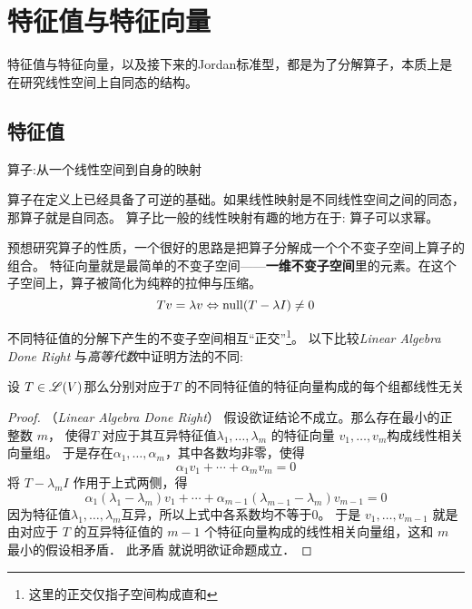 \chapter{特征值与特征向量}
特征值与特征向量，以及接下来的Jordan标准型，都是为了分解算子，本质上是在研究线性空间上自同态的结构。

\section{特征值}
\begin{definition}
    算子:从一个线性空间到自身的映射
\end{definition}

算子在定义上已经具备了可逆的基础。如果线性映射是不同线性空间之间的同态，那算子就是自同态。
算子比一般的线性映射有趣的地方在于: 算子可以求幂。

预想研究算子的性质，一个很好的思路是把算子分解成一个个不变子空间上算子的组合。
特征向量就是最简单的不变子空间——\textbf{一维不变子空间}里的元素。在这个子空间上，算子被简化为纯粹的拉伸与压缩。
\[
    Tv=\lambda v \Leftrightarrow \operatorname{null}(T-\lambda I)\neq {0}
\]

不同特征值的分解下产生的不变子空间相互``正交''\footnote{这里的正交仅指子空间构成直和}。
以下比较\textit{Linear Algebra Done Right} 与\textit{高等代数}中证明方法的不同:

\begin{theorem}
    设 \(T \in \mathscr{L}(V)\)那么分别对应于\(T\) 的不同特征值的特征向量构成的每个组都线性无关
\end{theorem}

\begin{proof}
    （\textit{Linear Algebra Done Right}）
    假设欲证结论不成立。那么存在最小的正整数 \(m\)， 使得\(T\)
    对应于其互异特征值\(\lambda_1, \dots ,\lambda_{m}\)
    的特征向量 \(v_1, \dots, v_m\)构成线性相关向量组。
    于是存在\(\alpha_1, \dots ,\alpha_{m}\)，其中各数均非零，使得
    \[\alpha_1 v_1 + \cdots + \alpha_m v_m = 0\]
    将 \(T-\lambda_{m}I\) 作用于上式两侧，得
    \[
        \alpha_1 (\lambda_1 - \lambda_m)v_1 + \cdots +
        \alpha_{m-1} (\lambda_{m-1} - \lambda_m)v_{m-1} = 0
    \]
    因为特征值\(\lambda_1,\dots ,\lambda_{m}\)互异，所以上式中各系数均不等于0。
    于是 \(v_1, \dots , v_{m-1}\) 就是由对应于 \(T\)
    的互异特征值的 \(m- 1\) 个特征向量构成的线性相关向量组，这和 \(m\) 最小的假设相矛盾． 此矛盾
    就说明欲证命题成立．
\end{proof}

